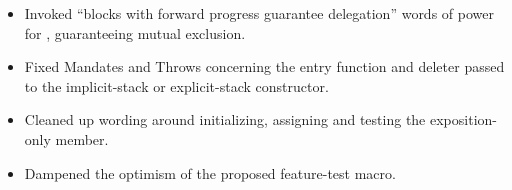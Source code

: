 \begin{itemize}
    \item Invoked ``blocks with forward progress guarantee delegation'' words
          of power for \resumewith, guaranteeing mutual exclusion.
    \item Fixed Mandates and Throws concerning the entry function and deleter
          passed to the implicit-stack or explicit-stack constructor.
    \item Cleaned up wording around initializing, assigning and testing the
          exposition-only  member.
    \item Dampened the optimism of the proposed feature-test macro.
\end{itemize}


